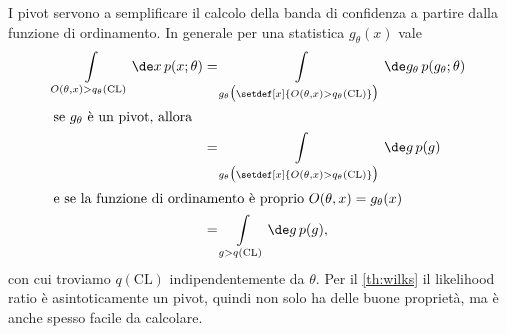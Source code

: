 I pivot servono a semplificare il calcolo della banda di confidenza a partire dalla funzione di ordinamento.
In generale per una statistica $g_\theta(x)$ vale
\begin{align*}
	\int\limits_{O(\theta,x)>q_\theta(\mathrm{CL})} \de x\, p(x;\theta)
	&= \int\limits_{g_\theta\big(\setdef[x]{O(\theta,x)>q_\theta(\mathrm{CL})}\big)}
	\de g_\theta\, p(g_\theta;\theta) \\
	\intertext{se $g_\theta$ è un pivot, allora}
	&= \int\limits_{g_\theta\big(\setdef[x]{O(\theta,x)>q_\theta(\mathrm{CL})}\big)}
	 \de g\, p(g) \\
	\intertext{e se la funzione di ordinamento è proprio $O(\theta,x)=g_\theta(x)$}
	&= \int\limits_{g>q(\mathrm{CL})} \de g\, p(g),
\end{align*}
con cui troviamo $q(\mathrm{CL})$ indipendentemente da $\theta$.
Per il \autoref{th:wilks} il likelihood ratio è asintoticamente un pivot,
quindi non solo ha delle buone proprietà,
ma è anche spesso facile da calcolare.

